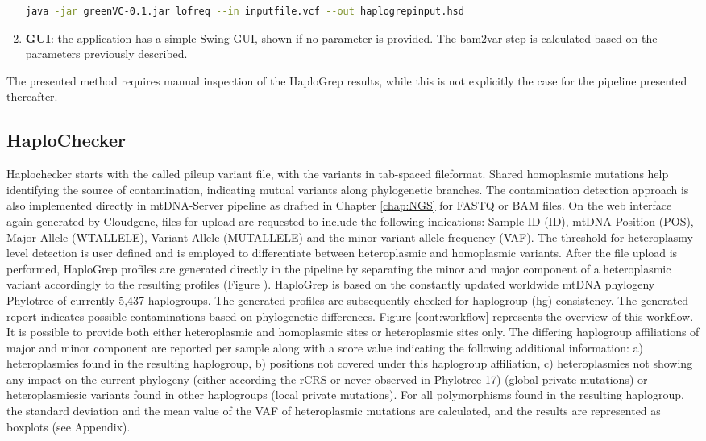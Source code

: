 \begin{enumerate}
\begin{lstlisting}[language=bash]
java -jar greenVC-0.1.jar lofreq --in inputfile.vcf --out haplogrepinput.hsd 
\end{lstlisting}
\item \textbf{GUI}: the application has a simple Swing GUI, shown if no parameter is provided. The bam2var step is calculated based on the parameters previously described.
\end{enumerate}
The presented method requires manual inspection of the HaploGrep results, while this is not explicitly the case for the pipeline presented thereafter. 
\subsection{HaploChecker}\label{cont:haplochecker}
Haplochecker starts with the called pileup variant file, with the variants in tab-spaced fileformat. Shared homoplasmic mutations help identifying the source of contamination, indicating mutual variants along phylogenetic branches. The contamination detection approach is also implemented directly in mtDNA-Server pipeline as drafted in Chapter \ref{chap:NGS} for FASTQ or BAM files. On the web interface again generated by Cloudgene, files for upload are requested to include the following indications: Sample ID (ID), mtDNA Position (POS), Major Allele (WTALLELE), Variant Allele (MUTALLELE) and the minor variant allele frequency (VAF). The threshold for heteroplasmy level detection is user defined and is employed to differentiate between heteroplasmic and homoplasmic variants. After the file upload is performed, HaploGrep  profiles are generated directly in the pipeline by separating the minor and major component of a heteroplasmic variant accordingly to the resulting profiles (Figure ). HaploGrep is based on the constantly updated worldwide mtDNA phylogeny Phylotree of currently 5,437 haplogroups. The generated profiles are subsequently checked for haplogroup (hg) consistency. The generated report indicates possible contaminations based on phylogenetic differences. Figure \ref{cont:workflow} represents the overview of this workflow. It is possible to provide both either heteroplasmic and homoplasmic sites or heteroplasmic sites only. The differing haplogroup affiliations of major and minor component are reported per sample along with a score value indicating the following additional information: a) heteroplasmies found in the resulting haplogroup, b) positions not covered under this haplogroup affiliation, c) heteroplasmies not showing any impact on the current phylogeny (either according the rCRS or never observed in Phylotree 17) (global private mutations) or heteroplasmiesic variants found in other haplogroups (local private mutations). For all polymorphisms found in the resulting haplogroup, the standard deviation and the mean value of the VAF of heteroplasmic mutations are calculated, and the results are represented as boxplots (see Appendix). 
